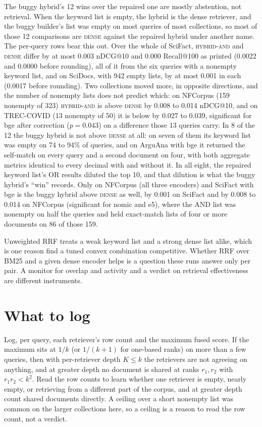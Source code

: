 \documentclass[11pt]{article}
\begin{document}
The buggy hybrid's 12 wins over the repaired one are mostly abstention, not retrieval. When the keyword list is empty, the hybrid is the dense retriever, and the buggy builder's list was empty on most queries of most collections, so most of those 12 comparisons are \textsc{dense} against the repaired hybrid under another name. The per-query rows bear this out. Over the whole of SciFact, \textsc{hybrid-and} and \textsc{dense} differ by at most 0.003 nDCG@10 and 0.000 Recall@100 as printed (0.0022 and 0.0000 before rounding), all of it from the six queries with a nonempty keyword list, and on SciDocs, with 942 empty lists, by at most 0.001 in each (0.0017 before rounding). Two collections moved more, in opposite directions, and the number of nonempty lists does not predict which: on NFCorpus (159 nonempty of 323) \textsc{hybrid-and} is above \textsc{dense} by 0.008 to 0.014 nDCG@10, and on TREC-COVID (13 nonempty of 50) it is below by 0.027 to 0.039, significant for bge after correction ($p = 0.043$) on a difference those 13 queries carry. In 8 of the 12 the buggy hybrid is not above \textsc{dense} at all: on seven of them its keyword list was empty on 74 to 94\% of queries, and on ArguAna with bge it returned the self-match on every query and a second document on four, with both aggregate metrics identical to every decimal with and without it. In all eight, the repaired keyword list's OR results diluted the top 10, and that dilution is what the buggy hybrid's ``win'' records. Only on NFCorpus (all three encoders) and SciFact with bge is the buggy hybrid above \textsc{dense} as well, by 0.001 on SciFact and by 0.008 to 0.014 on NFCorpus (significant for nomic and e5), where the AND list was nonempty on half the queries and held exact-match lists of four or more documents on 86 of those 159.

Unweighted RRF treats a weak keyword list and a strong dense list alike, which is one reason \citet{bruch2023fusion} find a tuned convex combination competitive. Whether RRF over BM25 and a given dense encoder helps is a question these runs answer only per pair. A monitor for overlap and activity and a verdict on retrieval effectiveness are different instruments.

\section{What to log}
\label{sec:log}

Log, per query, each retriever's row count and the maximum fused score. If the maximum sits at $1/k$ (or $1/(k+1)$ for one-based ranks) on more than a few queries, then with per-retriever depth $K \le k$ the retrievers are not agreeing on anything, and at greater depth no document is shared at ranks $r_1, r_2$ with $r_1 r_2 < k^2$. Read the row counts to learn whether one retriever is empty, nearly empty, or retrieving from a different part of the corpus, and at greater depth count shared documents directly. A ceiling over a short nonempty list was common on the larger collections here, so a ceiling is a reason to read the row count, not a verdict.
\end{document}
